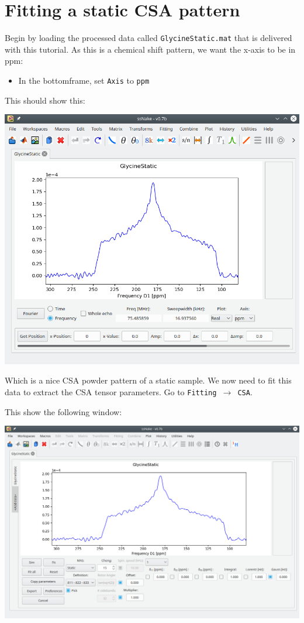 \documentclass[11pt,a4paper]{article}
\begin{document}
\section{Fitting a static CSA pattern}
Begin by loading the processed data called \texttt{GlycineStatic.mat} that is delivered with this
tutorial. As this is a chemical shift pattern, we want the x-axis to be in ppm:
\begin{itemize}
  \item In the bottomframe, set \texttt{Axis} to \texttt{ppm}
\end{itemize}
This should show this:
\begin{center}
\includegraphics[width=0.8\linewidth]{Figs/Fig1.png}
\end{center}
Which is a nice CSA powder pattern of a static sample. We now need to fit this data to extract the
CSA tensor parameters. Go to \texttt{Fitting $\longrightarrow$ CSA}.

This show the following window:
\begin{center}
\includegraphics[width=0.8\linewidth]{Figs/Fig2.png}
\end{center}
\end{document}
